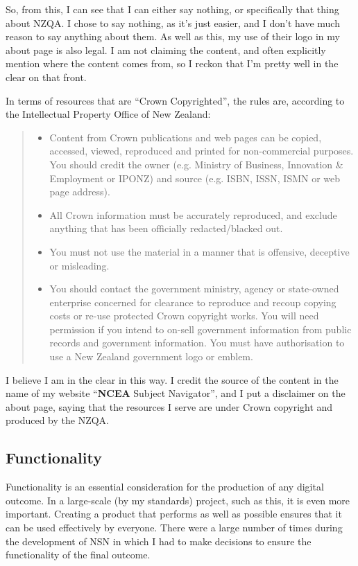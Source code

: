 \documentclass{article}
\begin{document}
So, from this, I can see that I can either say nothing, or specifically that thing about NZQA. I chose to say nothing, as it's just easier, and I don't have much reason to say anything about them. As well as this, my use of their logo in my about page is also legal. I am not claiming the content, and often explicitly mention where the content comes from, so I reckon that I'm pretty well in the clear on that front.

In terms of resources that are ``Crown Copyrighted'', the rules are, according to the Intellectual Property Office of New Zealand:
\begin{quote}
    \begin{itemize}
        \item Content from Crown publications and web pages can be copied, accessed, viewed, reproduced and printed for non-commercial purposes. You should credit the owner (e.g. Ministry of Business, Innovation \& Employment or IPONZ) and source (e.g. ISBN, ISSN, ISMN or web page address).
        \item All Crown information must be accurately reproduced, and exclude anything that has been officially redacted/blacked out.
        \item You must not use the material in a manner that is offensive, deceptive or misleading.
        \item You should contact the government ministry, agency or state-owned enterprise concerned for clearance to reproduce and recoup copying costs or re-use protected Crown copyright works. You will need permission if you intend to on-sell government information from public records and government information. You must have authorisation to use a New Zealand government logo or emblem.
    \end{itemize}
\end{quote}

I believe I am in the clear in this way. I credit the source of the content in the name of my website ``\textbf{NCEA} Subject Navigator'', and I put a disclaimer on the about page, saying that the resources I serve are under Crown copyright and produced by the NZQA.

\subsection*{Functionality}
Functionality is an essential consideration for the production of any digital outcome. In a large-scale (by my standards) project, such as this, it is even more important. Creating a product that performs as well as possible ensures that it can be used effectively by everyone. There were a large number of times during the development of NSN in which I had to make decisions to ensure the functionality of the final outcome.
\end{document}
